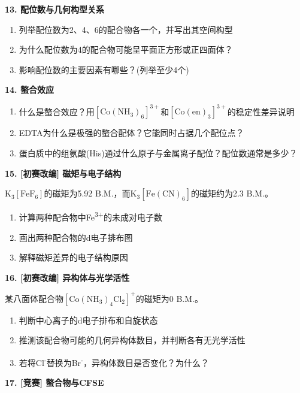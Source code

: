\documentclass[a4paper,11pt]{ctexart}
\providecommand{\tightlist}{\setlength{\itemsep}{0pt}\setlength{\parskip}{0pt}}
\newcommand{\箭}{\ensuremath{\rightarrow}}
\newcommand{\左箭}{\ensuremath{\leftarrow}}
\newcommand{\上箭}{\ensuremath{\uparrow}}
\newcommand{\下箭}{\ensuremath{\downarrow}}
\newcommand{\衡}{\ensuremath{\rightleftharpoons}}
\newcommand{\双箭}{\ensuremath{\leftrightarrow}}
\newcommand{\约等于}{\ensuremath{\approx}}
\newcommand{\小于等于}{\ensuremath{\leq}}
\newcommand{\大于等于}{\ensuremath{\geq}}
\newcommand{\不等于}{\ensuremath{\neq}}
\newcommand{\西格马}{\ensuremath{\sigma}}
\newcommand{\派}{\ensuremath{\pi}}
\begin{document}
\textbf{13. 配位数与几何构型关系}

\begin{enumerate}
\def\labelenumi{(\alph{enumi})}
\tightlist
\item
  列举配位数为2、4、6的配合物各一个，并写出其空间构型
\item
  为什么配位数为4的配合物可能呈平面正方形或正四面体？
\item
  影响配位数的主要因素有哪些？(列举至少4个)
\end{enumerate}

\textbf{14. 螯合效应}

\begin{enumerate}
\def\labelenumi{(\alph{enumi})}
\tightlist
\item
  什么是螯合效应？用\(\mathrm{[Co(NH_3)_6]^{3+}}\)和\(\mathrm{[Co(en)_3]^{3+}}\)的稳定性差异说明
\item
  EDTA为什么是极强的螯合配体？它能同时占据几个配位点？
\item
  蛋白质中的组氨酸(His)通过什么原子与金属离子配位？配位数通常是多少？
\end{enumerate}

\textbf{15. {[}初赛改编{]} 磁矩与电子结构}

\(\mathrm{K_3[FeF_6]}\)的磁矩为5.92 B.M.，而\(\mathrm{K_3[Fe(CN)_6]}\)的磁矩约为2.3 B.M.。

\begin{enumerate}
\def\labelenumi{(\alph{enumi})}
\tightlist
\item
  计算两种配合物中Fe\textsuperscript{3+}的未成对电子数
\item
  画出两种配合物的d电子排布图
\item
  解释磁矩差异的电子结构原因
\end{enumerate}

\textbf{16. {[}初赛改编{]} 异构体与光学活性}

某八面体配合物\(\mathrm{[Co(NH_3)_4Cl_2]^+}\)的磁矩为0 B.M.。

\begin{enumerate}
\def\labelenumi{(\alph{enumi})}
\tightlist
\item
  判断中心离子的d电子排布和自旋状态
\item
  推测该配合物可能的几何异构体数目，并判断各有无光学活性
\item
  若将Cl\textsuperscript{-}替换为Br\textsuperscript{-}，异构体数目是否变化？为什么？
\end{enumerate}

\textbf{17. {[}竞赛{]} 螯合物与CFSE}
\end{document}
